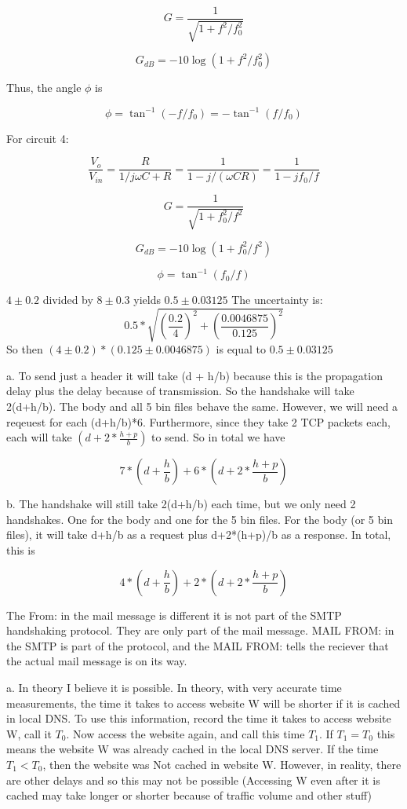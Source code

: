 \documentclass{article}
\begin{document}
$$G = \frac{1}{\sqrt{1 + f^2/f^2_0}}$$

$$G_{dB} = -10 \log (1 + f^2/f^2_0)$$

Thus, the angle $\phi$ is 

$$\phi = \tan ^{-1} (-f/f_0) = - \tan ^{-1} (f/f_0) $$

For circuit 4:

$$\frac{V_o}{V_{in}} = \frac{R}{1/j \omega C + R} = \frac{1}{1 - j/ (\omega C R)} =  \frac{1}{1 - j f_0/f}$$

$$G = \frac{1}{\sqrt{1 + f_0^2/f^2}}$$

$$G_{dB} = -10 \log (1 + f_0^2/f^2)$$

$$\phi = \tan ^{-1} (f_0/f) $$

$4\pm0.2$ divided by $8\pm0.3$ yields $0.5\pm0.03125$
The uncertainty is: $$0.5*\sqrt{(\frac{0.2}{4})^2+(\frac{0.0046875}{0.125})^2}$$ 
 So then $(4\pm0.2)*(0.125\pm0.0046875)$ is equal to $0.5\pm0.03125$




a. To send just a header it will take (d + h/b) because this is the propagation delay plus the delay because of transmission. So the handshake will take 2(d+h/b). The body and all 5 bin files behave the same. However, we will need a reqeuest for each (d+h/b)*6. Furthermore, since they take 2 TCP packets each, each will take $(d+2*\frac{h+p}{b})$ to send. So in total we have

$$7*(d+\frac{h}{b}) +  6*(d+2*\frac{h+p}{b})$$

b. The handshake will still take 2(d+h/b) each time, but we only need 2 handshakes. One for the body and one for the 5 bin files. For the body (or 5 bin files), it will take d+h/b as a request plus d+2*(h+p)/b as a response.  In total, this is

$$4*(d+\frac{h}{b}) +  2*(d+2*\frac{h+p}{b})$$

The From: in the mail message is different it is not part of the SMTP handshaking protocol. They are only part of the mail message. MAIL FROM: in the SMTP is part of the protocol, and the MAIL FROM: tells the reciever that the actual mail message is on its way.  

a. In theory I believe it is possible. In theory, with very accurate time measurements, the time it takes to access website W will be shorter if it is cached in local DNS. To use this information, record the time it takes to access website W, call it $T_0$. Now access the website again, and call this time $T_1$. If $T_1 = T_0$ this means the website W was already cached in the local DNS server. If the time $T_1 < T_0$, then the website was Not cached in website W. However, in reality, there are other delays and so this may not be possible (Accessing W even after it is cached may take longer or shorter because of traffic volume and other stuff)
\end{document}
